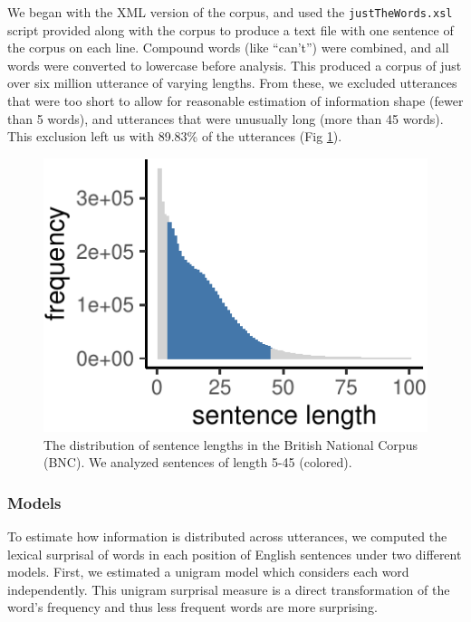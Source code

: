 \documentclass[entropy,article,submit,moreauthors,pdftex]{mdpi}
\begin{document}
We began with the XML version of the corpus, and used the
\texttt{justTheWords.xsl} script provided along with the corpus to
produce a text file with one sentence of the corpus on each line.
Compound words (like ``can't'') were combined, and all words were
converted to lowercase before analysis. This produced a corpus of just
over six million utterance of varying lengths. From these, we excluded
utterances that were too short to allow for reasonable estimation of
information shape (fewer than 5 words), and utterances that were
unusually long (more than 45 words). This exclusion left us with 89.83\%
of the utterances (Fig \ref{fig:bnc-lengths}).

\begin{figure}[tb]

{\centering \includegraphics{figs/bnc-lengths-1} 

}

\caption{The distribution of sentence lengths in the British National Corpus (BNC). We analyzed sentences of length 5-45 (colored).}\label{fig:bnc-lengths}
\end{figure}

\hypertarget{models}{%
\subsubsection{Models}\label{models}}

To estimate how information is distributed across utterances, we
computed the lexical surprisal of words in each position of English
sentences under two different models. First, we estimated a unigram
model which considers each word independently. This unigram surprisal
measure is a direct transformation of the word's frequency and thus less
frequent words are more surprising.
\end{document}
